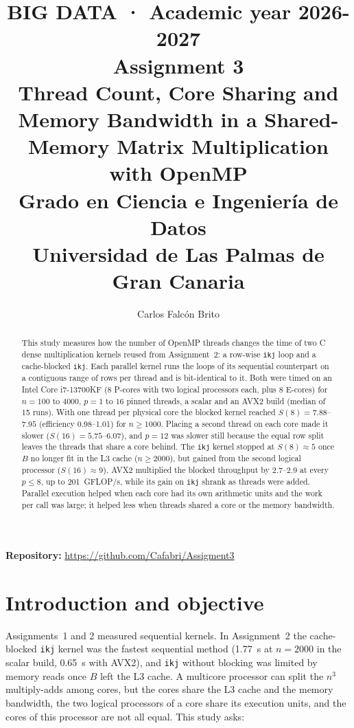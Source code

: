\documentclass[11pt,a4paper]{article}
\title{
    \large \textbf{BIG DATA · Academic year 2026-2027} \\[0.4em]
    \LARGE Assignment 3 \\
    \Large Thread Count, Core Sharing and Memory Bandwidth in a Shared-Memory Matrix
    Multiplication with OpenMP \\[0.4em]
    \small Grado en Ciencia e Ingeniería de Datos \\
    \small Universidad de Las Palmas de Gran Canaria
}
\author{Carlos Falcón Brito}
\date{}
\begin{document}
\maketitle
\thispagestyle{empty}

\begin{center}
\textbf{Repository:} \url{https://github.com/Cafabri/Assigment3}
\end{center}

\begin{abstract}
\noindent
This study measures how the number of OpenMP threads changes the time of two C dense
multiplication kernels reused from Assignment~2: a row-wise \texttt{ikj} loop and a
cache-blocked \texttt{ikj}. Each parallel kernel runs the loops of its sequential
counterpart on a contiguous range of rows per thread and is bit-identical to it. Both were
timed on an Intel Core i7-13700KF (8 P-cores with two logical processors each, plus
8 E-cores) for $n = 100$ to $4000$, $p = 1$ to $16$ pinned threads, a scalar and an AVX2
build (median of 15 runs). With one thread per physical core the blocked kernel reached
$S(8) = 7.88$--$7.95$ (efficiency 0.98--1.01) for $n \ge 1000$. Placing a second thread on
each core made it slower ($S(16) = 5.75$--$6.07$), and $p = 12$ was slower still because the
equal row split leaves the threads that share a core behind. The \texttt{ikj} kernel stopped
at $S(8) \approx 5$ once $B$ no longer fit in the L3 cache ($n \ge 2000$), but gained from the
second logical processor ($S(16) \approx 9$). AVX2 multiplied the blocked throughput by
2.7--2.9 at every $p \le 8$, up to 201~GFLOP/s, while its gain on \texttt{ikj} shrank as
threads were added. Parallel execution helped when each core had its own arithmetic units
and the work per call was large; it helped less when threads shared a core or the memory
bandwidth.
\end{abstract}

\section{Introduction and objective}

Assignments~1 and 2 measured sequential kernels. In Assignment~2 the cache-blocked
\texttt{ikj} kernel was the fastest sequential method (1.77~s at $n = 2000$ in the scalar
build, 0.65~s with AVX2), and \texttt{ikj} without blocking was limited by memory reads
once $B$ left the L3 cache. A multicore processor can split the $n^3$ multiply-adds among
cores, but the cores share the L3 cache and the memory bandwidth, the two logical
processors of a core share its execution units, and the cores of this processor are not
all equal. This study asks:
\end{document}
